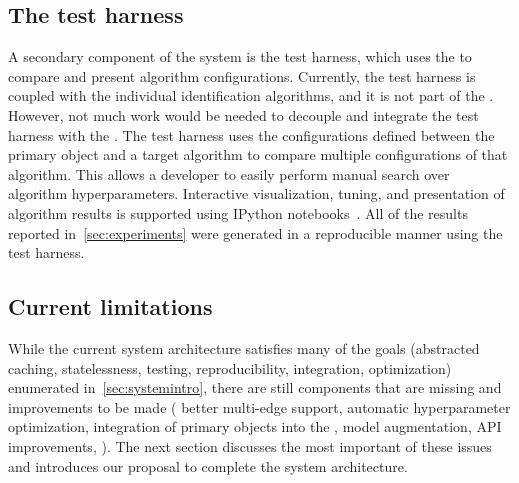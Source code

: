 
    \subsection{The test harness}
    A secondary component of the system is the test harness, which uses the
      \depcache{} to compare and present algorithm configurations.
    Currently, the test harness is coupled with the individual identification
      algorithms, and it is not part of the \depcache{}.
    However, not much work would be needed to decouple and integrate the test
      harness with the \depcache{}.
    The test harness uses the configurations defined between the primary
      object and a target algorithm to compare multiple configurations of that
      algorithm.
    This allows a developer to easily perform manual search over algorithm
      hyperparameters.
    Interactive visualization, tuning, and presentation of algorithm results
      is supported using IPython notebooks~\cite{perez_ipython_2007}.
    All of the results reported in~\cref{sec:experiments} were generated in a
      reproducible manner using the test harness.

    \subsection{Current limitations}
    While the current system architecture satisfies many of the goals
      (abstracted caching, statelessness, testing, reproducibility, integration,
      optimization) enumerated in~\cref{sec:systemintro}, there are still
      components that are missing and improvements to be made (%
    better multi-edge support, %
    automatic hyperparameter optimization, %
    integration of primary objects into the \depcache{}, %
    model augmentation, %
    API improvements, \etc{}).
    The next section discusses the most important of these issues and
      introduces our proposal to complete the system architecture.

